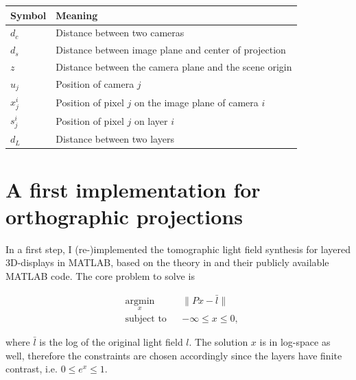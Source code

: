 \documentclass[11pt,a4paper,titlepage]{article}
\begin{document}
\begin{center}
	\begin{tabular}{|l|l|}
	
		\hline
		Symbol 	& Meaning \\
		\hline
		$d_c$ 	& Distance between two cameras \\ 
		
		$d_s$ 	& Distance between image plane and center of projection \\ 
		
		$z$ 	& Distance between the camera plane and the scene origin \\ 
		
		$u_j$	& Position of camera $j$ \\
		
		$x_j^i$ & Position of pixel $j$ on the image plane of camera $i$ \\
		
		$s_j^i$ & Position of pixel $j$ on layer $i$ \\ 
		
		$d_L$ 	& Distance between two layers \\ 
		\hline

	\end{tabular} 
\end{center}

\section{A first implementation for orthographic projections}	\label{sec:first_implementation}
In a first step, I (re-)implemented the tomographic light field synthesis for layered 3D-displays in MATLAB, based on the theory in \cite{WETZ_TOMO} and their publicly available MATLAB code. The core problem to solve is

\begin{equation} \label{eq:core_problem}
	\begin{aligned}
		& \underset{x}{\text{argmin}} & & \lVert Px - \bar{l} \rVert \\
		& \text{subject to} & & -\infty \leq x \leq 0,
	\end{aligned}
\end{equation}

where $\bar{l}$ is the log of the original light field $l$. The solution $x$ is in log-space as well, therefore the constraints are chosen accordingly since the layers have finite contrast, i.e. $0 \leq e^x \leq 1$.
\end{document}
